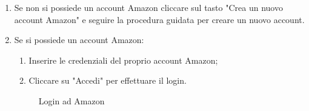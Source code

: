 \begin{enumerate}
\item Se non si possiede un account Amazon cliccare sul tasto "Crea un nuovo account Amazon" e seguire la procedura guidata per creare un nuovo account.
\item Se si possiede un account Amazon:
\begin{enumerate}
	\item Inserire le credenziali del proprio account Amazon;
	\item Cliccare su "Accedi" per effettuare il login.
\end{enumerate}
\begin{figure}[!ht]
	\centering
	\caption{Login ad Amazon}
\end{figure}

\end{enumerate}
\newpage
